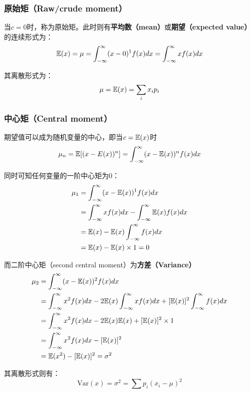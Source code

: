 \documentclass[11pt]{article}
\begin{document}
\subsubsection*{原始矩（Raw/crude moment）}

当$c=0$时，称为原始矩。此时则有\textbf{平均数（mean）}或\textbf{期望（expected value）}的连续形式为：
\begin{equation*}
    \mathbb{E}(x) = \mu = \int_{-\infty}^{\infty} (x-0)^1 f(x) dx =
    \int_{-\infty}^{\infty} x f(x) dx
\end{equation*}

其离散形式为：
\begin{equation*}
    \mu = \mathbb{E}(x) = \sum_i x_i p_i
\end{equation*}

\subsubsection*{中心矩（Central moment）}

期望值可以成为随机变量的中心，即当$c=\mathbb{E}(x)$时
\begin{equation*}
    \mu_n = \mathbb{E}[(x-E(x))^n] = \int_{-\infty}^{\infty} (x-\mathbb{E}(x))^n f(x) dx
\end{equation*}

同时可知任何变量的一阶中心矩为0：
\begin{align*}
    \mu_1 &= \int_{-\infty}^{\infty} (x-\mathbb{E}(x))^1 f(x) dx \\
    &= \int_{-\infty}^{\infty} x f(x) dx - \int_{-\infty}^{\infty} \mathbb{E}(x) f(x) dx \\
    &= \mathbb{E}(x) - \mathbb{E}(x) \int_{-\infty}^{\infty} f(x) dx \\
    &= \mathbb{E}(x) - \mathbb{E}(x) \times 1 = 0 
\end{align*}

而二阶中心矩（second central moment）为\textbf{方差（Variance）}
\begin{align*}
    \mu_2 &= \int_{-\infty}^{\infty} (x-\mathbb{E}(x))^2 f(x) dx \\
    &= \int_{-\infty}^{\infty} x^2 f(x)dx - 2 \mathbb{E}(x) \int_{-\infty}^{\infty} x f(x)dx + [\mathbb{E}(x)]^2\int_{-\infty}^{\infty}f(x)dx \\
    &= \int_{-\infty}^{\infty} x^2 f(x)dx - 2 \mathbb{E}(x) \mathbb{E}(x) + [\mathbb{E}(x)]^2\times 1 \\
    &= \int_{-\infty}^{\infty} x^2 f(x)dx - [\mathbb{E}(x)]^2 \\
    &= \mathbb{E}(x^2) - [\mathbb{E}(x)]^2 = \sigma^2
\end{align*}

其离散形式则有：
\begin{equation*}
    \text{Var}(x) = \sigma^2 = \sum p_i (x_i - \mu)^2 
\end{equation*}
\end{document}
